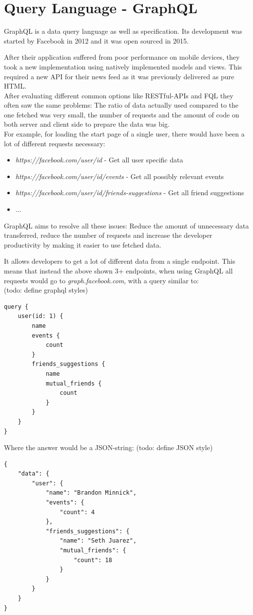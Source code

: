 \section{Query Language - GraphQL}
GraphQL is a data query language as well as specification. Its development was started by Facebook in 2012 and it was open sourced in 2015. \cite{GraphQLFoundation}

After their application suffered from poor performance on mobile devices, they took a new implementation using natively implemented models and views. This required a new API for their news feed as it was previously delivered as pure HTML.\\
After evaluating different common options like RESTful-APIs and FQL they often saw the same problems:  The ratio of data actually used compared to the one fetched was very small, the number of requests \cite{GraphQLIntro} and the amount of code on both server and client side to prepare the data was big. \cite{EngineeringFB}\\
For example, for loading the start page of a single user, there would have been a lot of different requests necessary:
\begin{itemize}
\item \emph{https://facebook.com/user/id} - Get all user specific data
\item \emph{https://facebook.com/user/id/events} - Get all possibly relevant events
\item \emph{https://facebook.com/user/id/friends-suggestions} - Get all friend suggestions
\item ...
\end{itemize} \cite{GraphQLIntro}

GraphQL aims to resolve all these issues: Reduce the amount of unnecessary data transferred, reduce the number of requests and increase the developer productivity by making it easier to use fetched data. \cite{EngineeringFB}

It allows developers to get a lot of different data from a single endpoint. This means that instead the above shown 3+ endpoints, when using GraphQL all requests would go to \emph{graph.facebook.com}, with a query similar to:\\ (todo: define graphql styles)
\newpage
\begin{lstlisting}[caption={A GraphQL Query},label={ex211}]
query {
	user(id: 1) {
		name
		events {
			count
		}
		friends_suggestions {
			name
			mutual_friends {
				count
			}
		}
	}
}
\end{lstlisting}
\citep[with adaptions]{GraphQLIntro}	
Where the answer would be a JSON-string: (todo: define JSON style)
\begin{lstlisting}[caption={Example Response Data},label={ex212}]
{ 
	"data": {
		"user": {
			"name": "Brandon Minnick",
			"events": {
				"count": 4
			},
			"friends_suggestions": {
				"name": "Seth Juarez",
				"mutual_friends": {
					"count": 18 
				}
			}
		}
	}
}
\end{lstlisting}
\citep[with adaptions]{GraphQLIntro}	

